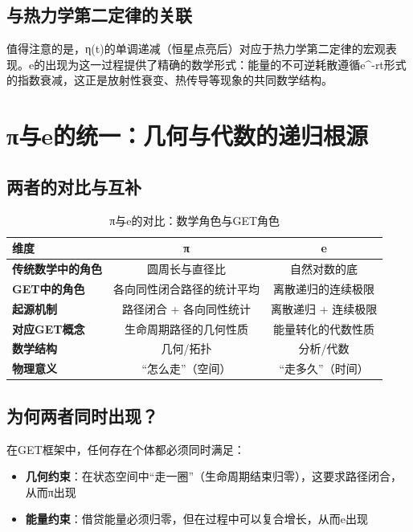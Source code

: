 \documentclass[12pt, a4paper]{article}
\begin{document}
\subsection{与热力学第二定律的关联}

值得注意的是，η(t)的单调递减（恒星点亮后）对应于热力学第二定律的宏观表现。e的出现为这一过程提供了精确的数学形式：能量的不可逆耗散遵循e^{-rt}形式的指数衰减，这正是放射性衰变、热传导等现象的共同数学结构。

\section{π与e的统一：几何与代数的递归根源}

\subsection{两者的对比与互补}

\begin{table}[h]
\centering
\caption{π与e的对比：数学角色与GET角色}
\label{tab:pie-comparison}
\begin{tabular}{@{}l|c|c@{}}
\toprule
\textbf{维度} & \textbf{π} & \textbf{e} \\
\midrule
\textbf{传统数学中的角色} & 圆周长与直径比 & 自然对数的底 \\
\textbf{GET中的角色} & 各向同性闭合路径的统计平均 & 离散递归的连续极限 \\
\textbf{起源机制} & 路径闭合 + 各向同性统计 & 离散递归 + 连续极限 \\
\textbf{对应GET概念} & 生命周期路径的几何性质 & 能量转化的代数性质 \\
\textbf{数学结构} & 几何/拓扑 & 分析/代数 \\
\textbf{物理意义} & “怎么走”（空间） & “走多久”（时间） \\
\bottomrule
\end{tabular}
\end{table}

\subsection{为何两者同时出现？}

在GET框架中，任何存在个体都必须同时满足：

\begin{itemize}
\item \textbf{几何约束}：在状态空间中“走一圈”（生命周期结束归零），这要求路径闭合，从而π出现
\item \textbf{能量约束}：借贷能量必须归零，但在过程中可以复合增长，从而e出现
\end{itemize}
\end{document}
